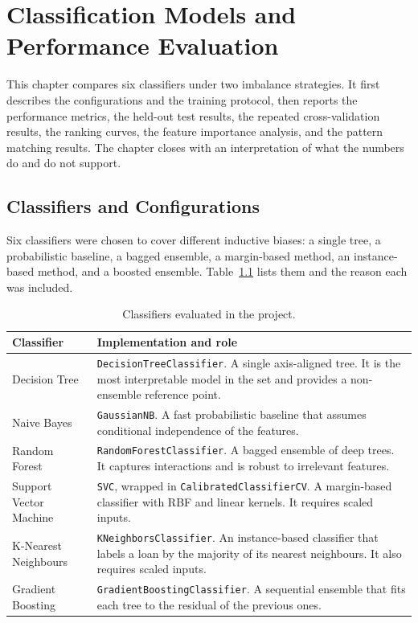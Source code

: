 \chapter{Classification Models and Performance Evaluation}
\label{ch:models}

This chapter compares six classifiers under two imbalance strategies. It first describes the configurations and the training protocol, then reports the performance metrics, the held-out test results, the repeated cross-validation results, the ranking curves, the feature importance analysis, and the pattern matching results. The chapter closes with an interpretation of what the numbers do and do not support.

\section{Classifiers and Configurations}
\label{sec:classifiers}

Six classifiers were chosen to cover different inductive biases: a single tree, a probabilistic baseline, a bagged ensemble, a margin-based method, an instance-based method, and a boosted ensemble. Table~\ref{tab:classifiers} lists them and the reason each was included.

\begin{table}[H]
    \centering
    \caption{Classifiers evaluated in the project.}
    \label{tab:classifiers}
    \begin{tabularx}{\textwidth}{@{}lX@{}}
        \toprule
        \textbf{Classifier} & \textbf{Implementation and role} \\
        \midrule
        Decision Tree & \texttt{DecisionTreeClassifier}. A single axis-aligned tree. It is the most interpretable model in the set and provides a non-ensemble reference point. \\
        Naive Bayes & \texttt{GaussianNB}. A fast probabilistic baseline that assumes conditional independence of the features. \\
        Random Forest & \texttt{RandomForestClassifier}. A bagged ensemble of deep trees. It captures interactions and is robust to irrelevant features. \\
        Support Vector Machine & \texttt{SVC}, wrapped in \texttt{CalibratedClassifierCV}. A margin-based classifier with RBF and linear kernels. It requires scaled inputs. \\
        K-Nearest Neighbours & \texttt{KNeighborsClassifier}. An instance-based classifier that labels a loan by the majority of its nearest neighbours. It also requires scaled inputs. \\
        Gradient Boosting & \texttt{GradientBoostingClassifier}. A sequential ensemble that fits each tree to the residual of the previous ones. \\
        \bottomrule
    \end{tabularx}
\end{table}

